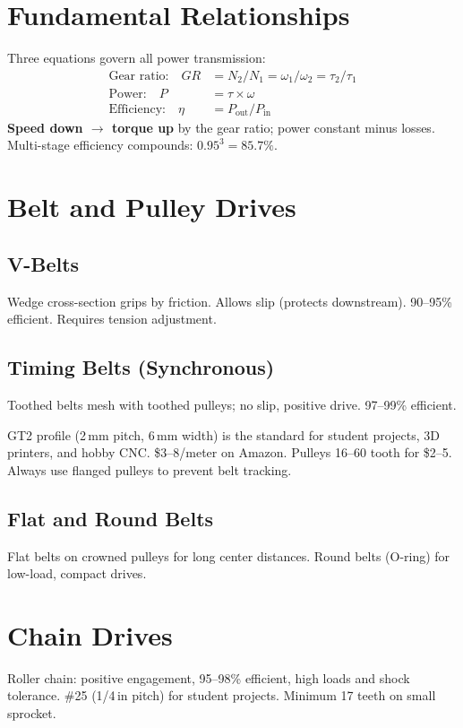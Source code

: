 \documentclass[11pt,letterpaper,twoside,openany]{book}
\begin{document}
\vspace{1em}

\section{Fundamental Relationships}
Three equations govern all power transmission:
\begin{align}
\text{Gear ratio:} \quad GR &= N_2/N_1 = \omega_1/\omega_2 = \tau_2/\tau_1 \\
\text{Power:} \quad P &= \tau \times \omega \\
\text{Efficiency:} \quad \eta &= P_{\text{out}}/P_{\text{in}}
\end{align}
\textbf{Speed down $\to$ torque up} by the gear ratio; power constant minus losses. Multi-stage efficiency compounds: $0.95^3 = 85.7\%$.

\section{Belt and Pulley Drives}
\subsection{V-Belts}
Wedge cross-section grips by friction. Allows slip (protects downstream). 90--95\% efficient. Requires tension adjustment.

\subsection{Timing Belts (Synchronous)}
Toothed belts mesh with toothed pulleys; no slip, positive drive. 97--99\% efficient.

\begin{tipbox}
GT2 profile (2\,mm pitch, 6\,mm width) is the standard for student projects, 3D printers, and hobby CNC. \$3--8/meter on Amazon. Pulleys 16--60 tooth for \$2--5. Always use flanged pulleys to prevent belt tracking.
\end{tipbox}

\subsection{Flat and Round Belts}
Flat belts on crowned pulleys for long center distances. Round belts (O-ring) for low-load, compact drives.

\section{Chain Drives}
Roller chain: positive engagement, 95--98\% efficient, high loads and shock tolerance. \#25 (1/4\,in pitch) for student projects. Minimum 17 teeth on small sprocket.
\end{document}
